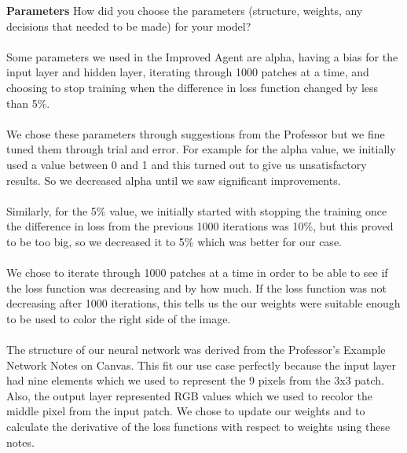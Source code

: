 \documentclass{article}
\theoremstyle{definition}
\begin{document}
    \textbf{Parameters}
        How did you choose the parameters (structure, weights, any decisions that needed to be made) for your model? \\\\
        Some parameters we used in the Improved Agent are alpha, having a bias for the input layer and hidden layer, iterating through 1000 patches at a time, and choosing to stop training when the difference in loss function changed by less than 5\%. \\\\
        We chose these parameters through suggestions from the Professor but we fine tuned them through trial and error. For example for the alpha value, we initially used a value between 0 and 1 and this turned out to give us unsatisfactory results. So we decreased alpha until we saw significant improvements. \\\\
        Similarly, for the 5\% value, we initially started with stopping the training once the difference in loss from the previous 1000 iterations was 10\%, but this proved to be too big, so we decreased it to 5\% which was better for our case. \\\\
        We chose to iterate through 1000 patches at a time in order to be able to see if the loss function was decreasing and by how much. If the loss function was not decreasing after 1000 iterations, this tells us the our weights were suitable enough to be used to color the right side of the image. \\\\
        The structure of our neural network was derived from the Professor's Example Network Notes on Canvas. This fit our use case perfectly because the input layer had nine elements which we used to represent the 9 pixels from the 3x3 patch. Also, the output layer represented RGB values which we used to recolor the middle pixel from the input patch. We chose to update our weights and to calculate the derivative of the loss functions with respect to weights using these notes.
        
\end{document}
